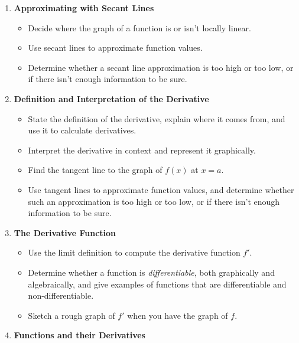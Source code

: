 \documentclass{article}
\begin{document}
\begin{enumerate}[start=8, topsep=0pt]
\item \textbf{Approximating with Secant Lines} %
\begin{itemize}
\item Decide where the graph of a function is or isn't locally linear.

\item Use secant lines to approximate function values.

\item Determine whether a secant line approximation is too high or too low, or if there isn't enough information to be sure.

\end{itemize}

\item \textbf{Definition and Interpretation of the Derivative} %
\begin{itemize}
\item State the definition of the derivative, explain where it comes from, and use it to calculate derivatives.

\item Interpret the derivative in context and represent it graphically.

\item Find the tangent line to the graph of $f(x)$ at $x = a$. 

\item Use tangent lines to approximate function values, and determine whether such an approximation is too high or too low, or if there isn't enough information to be sure.
\end{itemize}

\item \textbf{The Derivative Function} %
\begin{itemize}
\item Use the limit definition to compute the derivative function
  $f'$.

\item Determine whether a function is \emph{differentiable}, both
  graphically and algebraically, and give examples of functions that
  are differentiable and non-differentiable.

\item Sketch a rough graph of $f'$ when you have the graph of $f$. 

\end{itemize}

\item \textbf{Functions and their Derivatives} %
\begin{itemize}


\end{itemize}
\end{enumerate}
\end{document}

